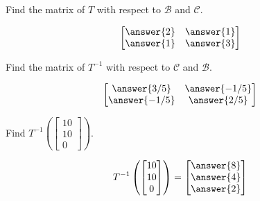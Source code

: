 \documentclass{ximera}
\begin{document}
\begin{problem}
	\begin{problem}\label{prob:matlintransabstract3}
    Find the matrix of $T$ with respect to $\mathcal{B}$ and $\mathcal{C}$.
    
    $$\begin{bmatrix}\answer{2}&\answer{1}\\\answer{1}&\answer{3}\end{bmatrix}$$
    \end{problem}

	\begin{problem}\label{prob:matlintransabstract4}
    Find the matrix of $T^{-1}$ with respect to $\mathcal{C}$ and $\mathcal{B}$.
    
    $$\begin{bmatrix}\answer{3/5}&\answer{-1/5}\\\answer{-1/5}&\answer{2/5}\end{bmatrix}$$
    \end{problem}
    
    \begin{problem}\label{prob:matlintransabstract5}
    Find $T^{-1}\left(\begin{bmatrix}10\\10\\0\end{bmatrix}\right)$.
    
    $$T^{-1}\left(\begin{bmatrix}10\\10\\0\end{bmatrix}\right)=\begin{bmatrix}\answer{8}\\\answer{4}\\\answer{2}\end{bmatrix}$$
    \end{problem}

\end{problem}
\end{document}
